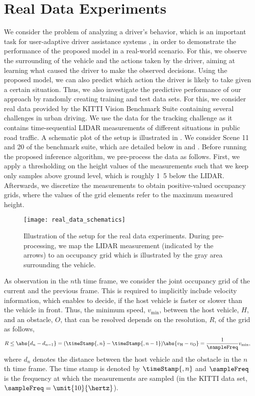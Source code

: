 \documentclass{article}
\begin{document}
\section{Real Data Experiments}
\label{sec::realdata}
We consider the problem of analyzing a driver's behavior, which is an important task for user-adaptive driver assistance systems \cite{McCall2007,Wang2016}, in order to demonstrate the performance of the proposed model in a real-world scenario.  
For this, we observe the surrounding of the vehicle and the actions taken by the driver, aiming at learning what caused the driver to make the observed decisions. 
Using the proposed model, we can also predict which action the driver is likely to take given a certain situation.
Thus, we also investigate the predictive performance of our approach by randomly creating training and test data sets.
For this, we consider real data provided by the KITTI Vision Benchmark Suite \cite{Geiger2012} containing several challenges in urban driving. 
We use the data for the tracking challenge as it contains time-sequential LIDAR measurements of different situations in public road traffic.
A schematic plot of the setup is illustrated in .
We consider Scene 11 and 20 of the benchmark suite, which are detailed below in  and .
Before running the proposed inference algorithm, we pre-process the data as follows.
First, we apply a thresholding on the height values of the measurements such that we keep only samples above ground level, which is roughly \unit{1.5}{\meter} below the LIDAR.
Afterwards, we discretize the measurements to obtain positive-valued occupancy grids, where the values of the grid elements refer to the maximum measured height. 

\begin{figure}
 \centering
 \texttt{[image: real\_data\_schematics]}
 \caption{Illustration of the setup for the real data experiments. During pre-processing, we map the LIDAR measurement (indicated by the arrows) to an occupancy grid which is illustrated by the gray area surrounding the vehicle.}
 \label{fig::res::real::setup}
\end{figure}

As observation in the $n$th time frame, we consider the joint occupancy grid of the current and the previous frame.
This is required to implicitly include velocity information, which enables to decide, \eg if the host vehicle is faster or slower than the vehicle in front. 
Thus, the minimum speed, $v_{\min}$, between the host vehicle, $H$, and an obstacle, $O$, that can be resolved depends on the resolution, $R$, of the grid as follows,
\begin{align*}
 R \leq \abs{ d_n - d_{n-1} } = (\timeStamp{,n} -\timeStamp{,n-1}) \abs{ v_\text{H} - v_\text{O} } = \frac{1}{\sampleFreq} v_{\min},
\end{align*}
where $d_n$ denotes the distance between the host vehicle and the obstacle in the $n$th time frame. The time stamp is denoted by $\timeStamp{,n}$ and $\sampleFreq$ is the frequency at which the measurements are sampled (in the KITTI data set, $\sampleFreq = \unit{10}{\hertz}$).
\end{document}
